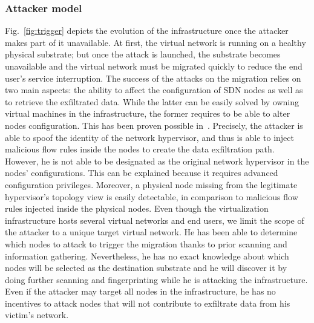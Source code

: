 

\subsubsection{Attacker model}
\label{sec:attack_model}
Fig.~\ref{fig:trigger} depicts the evolution of the infrastructure once the attacker makes part of it unavailable. 
At first, the virtual network is running on a healthy physical substrate; but once the attack is launched, the substrate becomes unavailable and the virtual network must be migrated quickly to reduce the end user's service interruption.
The success of the attacks on the migration relies on two main aspects: the ability to affect the configuration of SDN nodes as well as  to retrieve the exfiltrated data.
While the latter can be easily solved by owning virtual machines in the infrastructure, the former requires to be able to alter nodes configuration. This has been proven possible in~\cite{Taxonomy_Hizver2015, Bokani2015, attain-Ujcich2017}.
Precisely, the attacker is able to spoof the identity of the network hypervisor, and thus is able to inject malicious flow rules inside the nodes to create the data exfiltration path. 
However, he is not able to be designated as the original network hypervisor in the nodes' configurations. 
This can be explained because it requires advanced configuration privileges. Moreover, a physical node missing from the legitimate hypervisor's topology view is easily detectable, in comparison to malicious flow rules injected inside the physical nodes.
Even though the virtualization infrastructure hosts several virtual networks and end users, we limit the scope of the attacker to a unique target virtual network. 
He has been able to determine which nodes to attack to trigger the migration thanks to prior scanning and information gathering. 
Nevertheless, he has no exact knowledge about which nodes will be selected as the destination substrate and he will discover it by doing further scanning and fingerprinting  while he is attacking the infrastructure.  
Even if the attacker may target all nodes in the infrastructure, he has no incentives to attack nodes that will not contribute to exfiltrate data from his victim's network. 

